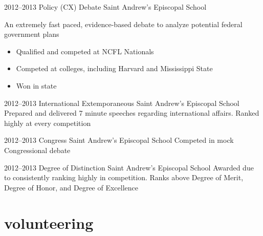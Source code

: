 \documentclass[]{friggeri-cv} %
\begin{document}
\begin{entrylist}

	\entry
	{2012--2013}
	{Policy (CX) Debate}
	{Saint Andrew's Episcopal School}
	{An extremely fast paced, evidence-based debate to analyze potential federal government plans
		\begin{itemize}
			\item Qualified and competed at NCFL Nationals
			\item Competed at colleges, including Harvard and Mississippi State
			\item Won  in state
		\end{itemize}
	}


	\entry
	{2012--2013}
	{International Extemporaneous}
	{Saint Andrew's Episcopal School}
	{Prepared and delivered 7 minute speeches regarding international affairs. Ranked highly at every competition}


	\entry
	{2012--2013}
	{Congress}
	{Saint Andrew's Episcopal School}
	{Competed in mock Congressional debate}


	\entry
	{2012--2013}
	{Degree of Distinction}
	{Saint Andrew's Episcopal School}
	{
	Awarded due to consistently ranking highly in competition. Ranks above Degree of Merit, Degree of Honor, and Degree of Excellence}

\end{entrylist}


\section{volunteering}
\end{document}
